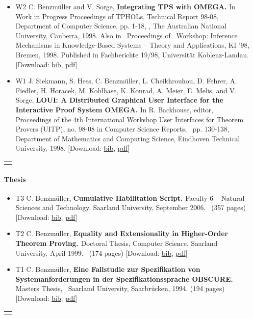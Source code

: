 \documentclass{article}
\newcommand{\tmtextbf}[1]{{\bfseries{#1}}}
\newenvironment{itemizedot}{\begin{itemize} \renewcommand{\labelitemi}{$\bullet$}\renewcommand{\labelitemii}{$\bullet$}\renewcommand{\labelitemiii}{$\bullet$}\renewcommand{\labelitemiv}{$\bullet$}}{\end{itemize}}
\begin{document}
\begin{itemizedot}
  \item [W2] {\small C. Benzm\"uller and V. Sorge, \tmtextbf{Integrating TPS
  with OMEGA.} In Work in Progress Proceedings of TPHOLs, Technical Report
  98-08, Department of Computer Science, pp. 1-18, , The Australian National
  University, Canberra, 1998. Also in \ Proceedings of \ Workshop: Inference
  Mechanisms in Knowledge-Based Systems -- Theory and Applications, KI '98,
  Bremen, 1998. Published in Fachberichte 19/98, Universit\"at
  Koblenz-Landau.} {\color{grey} [Download: {\small
  \href{../papers/W2.bib}{bib}, \href{../papers/W2.pdf}{pdf}}]}
  
  \item [W1] {\small J. Siekmann, S. Hess, C. Benzm\"uller, L. Cheikhrouhou,
  D. Fehrer, A. Fiedler, H. Horacek, M. Kohlhase, K. Konrad, A. Meier, E.
  Melis, and V. Sorge, \tmtextbf{LOUI: A Distributed Graphical User Interface
  for the Interactive Proof System OMEGA.}} {\small In R. Backhouse, editor,
  Proceedings of the 4th International Workshop User Interfaces for Theorem
  Provers (UITP), no. 98-08 in Computer Science Reports, \ pp. 130-138,
  Department of Mathematics and Computing Science, Eindhoven Technical
  University, 1998.} {\color{grey} [Download: {\small
  \href{../papers/W1.bib}{bib}, \href{../papers/W1.pdf}{pdf}}]}
\end{itemizedot}
{\noindent}\begin{tabular}{l}
  \hline
  \quad
\end{tabular}

\paragraph{Thesis}

\begin{itemizedot}
  \item [T3] {\small C. Benzm\"uller, \tmtextbf{Cumulative Habilitation
  Script. }}Faculty 6 -- Natural Sciences and Technology{\small , Saarland
  University, September 2006. \ (357 pages)} {\color{grey} [Download: {\small
  \href{../papers/T3.bib}{bib}, \href{../papers/T3.pdf}{pdf}}]}
  
  \item [T2] {\small C. Benzm\"uller, \tmtextbf{Equality and Extensionality in
  Higher-Order Theorem Proving. }Doctoral Thesis, Computer Science, Saarland
  University, April 1999. \ (174 pages)} {\color{grey} [Download: {\small
  \href{../papers/T2.bib}{bib}, \href{../papers/T2.pdf}{pdf}}]}
  
  \item [T1] {\small C. Benzm\"uller, \tmtextbf{Eine Fallstudie zur
  Spezifikation von Systemanforderungen in der Spezifikationssprache
  OBSCURE.}} {\small Masters Thesis, \ Saarland University, Saarbr\"ucken,
  1994. (194 pages)} {\color{grey} [Download: {\small
  \href{../papers/T1.bib}{bib}, \href{../papers/T1.pdf}{pdf}}]}
\end{itemizedot}
{\noindent}\begin{tabular}{l}
  \hline
  \quad
\end{tabular}
\end{document}
